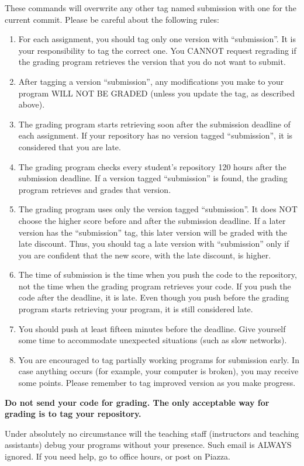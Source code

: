 \documentclass{article}
\begin{document}
These commands will overwrite any other tag named submission with one for the current commit. Please be careful about the following rules:
\begin{enumerate}
\item For each assignment, you should tag only one version with ``submission''. It is your responsibility to tag the correct one. You CANNOT request regrading if the grading program retrieves the version that you do not want to submit.

\item After tagging a version ``submission'', any modifications you make to your program WILL NOT BE GRADED (unless you update the tag, as described above).

\item The grading program starts retrieving soon after the submission deadline of each assignment. If your repository has no version tagged ``submission'', it is considered that you are late.

\item The grading program checks every student's repository 120 hours after the submission deadline. If a version tagged ``submission'' is found, the grading program retrieves and grades that version.

\item The grading program uses only the version tagged ``submission''. It does NOT choose the higher score before and after the submission deadline. If a later version has the ``submission'' tag, this later version will be graded with the late discount. Thus, you should tag a late version with ``submission'' only if
you are confident that the new score, with the late discount, is higher.

\item The time of submission is the time when you push the code to the repository, not the time when the grading program retrieves your code. If you push the code after the deadline, it is late. Even though you push before the grading program starts retrieving your program, it is still considered late.

\item You should push at least fifteen minutes before the deadline. Give yourself some time to accommodate unexpected situations (such as slow networks).

\item You are encouraged to tag partially working programs for submission early. In case anything occurs (for example, your computer is broken), you may receive some points. Please remember to tag improved version as you make progress.

\end{enumerate}
\textbf{Do not send your code for grading. The only acceptable way for grading is to tag your repository.}

Under absolutely no circumstance will the teaching staff (instructors and teaching assistants) debug your programs without your presence. Such email is ALWAYS ignored. If you need help, go to office hours, or post on Piazza.
\end{document}
